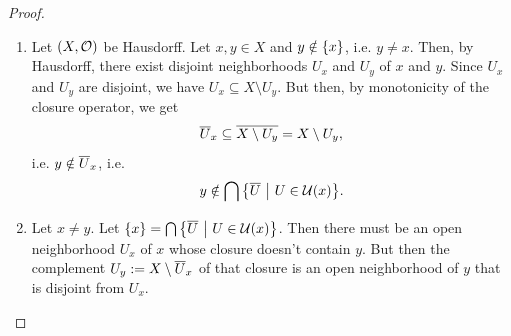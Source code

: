 \begin{proof}
	\begin{enumerate}
		\item[$\Rightarrow$] Let $(X, \mathcal{O})$ be Hausdorff. Let $x,y \in X$ and $y \notin \qty{x}$, i.e. $y \neq x$. Then, by Hausdorff, there exist disjoint neighborhoods $U_x$ and $U_y$ of $x$ and $y$. Since $U_x$ and $U_y$ are disjoint, we have $U_x \subseteq X \setminus U_y.$ But then, by monotonicity of the closure operator, we get
		\begin{align*}
			\overline{{U}}_x \subseteq \overline{{X \setminus U_y}} = X \setminus U_y,
		\end{align*}
		i.e. $y \notin \overline{{U}}_x$, i.e.
		\begin{align*}
			y \notin \bigcap \qty{\overline{{U}} ~\middle|~U \in \mathcal{U}(x)}.
		\end{align*}
		\item[$\Leftarrow$] Let $x \neq y$. Let $\qty{x} = \bigcap \qty{\overline{{U}} ~\middle|~U \in \mathcal{U}(x)}$. Then there must be an open neighborhood $U_x$ of $x$ whose closure doesn't contain $y$. But then the complement $U_y := X \setminus \overline{{U}}_x$ of that closure is an open neighborhood of $y$ that is disjoint from $U_x$.
	\end{enumerate}
\end{proof}

\clearpage

